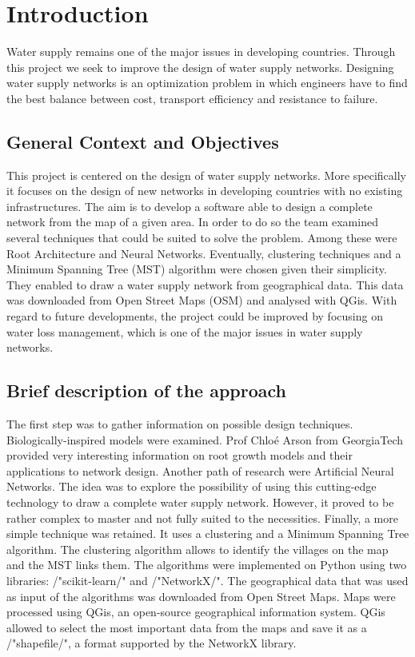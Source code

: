 \chapter{Introduction}
\label{Introduzione}
\thispagestyle{empty}



\noindent Water supply remains one of the major issues in developing countries. Through this
project we seek to improve the design of water supply networks. Designing water supply
networks is an optimization problem in which engineers have to find the best balance
between cost, transport efficiency and resistance to failure.

\section{General Context and Objectives}
This project is centered on the design of water supply networks. More specifically it focuses on the design of new 
networks in developing countries with no existing infrastructures.
The aim is to develop a software able to design a complete network from the map of a given area.
In order to do so the team examined several techniques that could be suited to solve the problem.
Among these were Root Architecture and Neural Networks. Eventually, clustering techniques and a Minimum
Spanning Tree (MST) algorithm were chosen given their simplicity. They enabled to draw a water supply network 
from geographical data. This data was downloaded from Open Street Maps (OSM) and analysed with QGis.
With regard to future developments, the project could be improved by focusing on water loss management,
which is one of the major issues in water supply networks.

\section{Brief description of the approach}
The first step was to gather information on possible design techniques. Biologically-inspired models were
examined. Prof Chloé Arson from GeorgiaTech 
provided very interesting information on root growth models and their applications to network design.
Another path of research were Artificial Neural Networks. The idea was to explore the possibility of using
this cutting-edge technology to draw a complete water supply network. However, it proved to be rather complex
to master and not fully suited to the necessities.
Finally, a more simple technique was retained. It uses a clustering and a Minimum Spanning Tree algorithm.
The clustering algorithm allows to identify the villages on the map and the MST links them.
The algorithms were implemented on Python using two libraries: /"scikit-learn/" and /"NetworkX/".
The geographical data that was used as input of the algorithms was downloaded from Open Street Maps. 
Maps were processed using 
QGis, an open-source geographical information system. QGis allowed to select the most important 
data from the maps
and save it as a /"shapefile/", a format supported by the NetworkX library.


